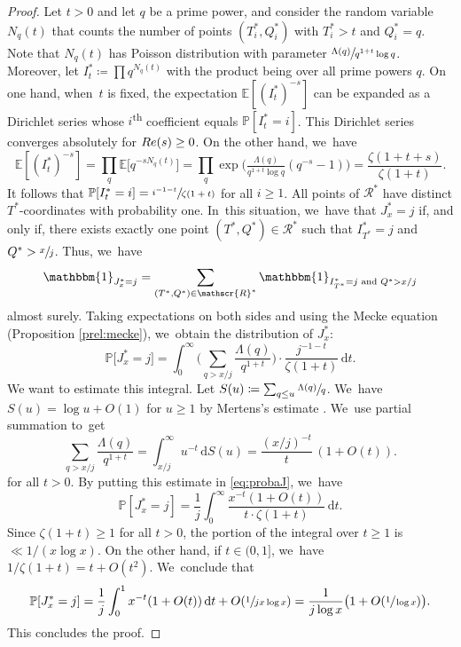 \documentclass[10pt,a4paper]{article}
\newcommand{\PP}{\mathbb{P}}
\newcommand{\EE}{\mathbb{E}}
\newcommand{\one}{\mathbbm{1}}
\newcommand{\RS}{\mathscr{R}}
\newcommand{\riemint}[4]{\int_{#1}^{#2}\! #3 \, \mathrm{d}#4}
\renewcommand{\Re}{\textup{Re}}
\newcommand{\bg}{\big}
\newcommand{\bgg}{\Big}
\theoremstyle{plain}
\theoremstyle{definition}
\begin{document}
\begin{proof}
Let $t>0$ and let $q$ be a prime power, and consider the random variable $N_q(t)$ that counts the number of points $(T^*_i, Q^*_i)$ with $T^*_i > t$ and $Q^*_i = q$. Note that $N_q(t)$ has Poisson distribution with parameter $\sfrac{\Lambda(q)}{q^{1+t}\log q}$. Moreover, let $I^*_t \coloneqq \prod q^{N_q(t)}$ with the product being over all prime powers $q$. On one hand, when~$t$ is fixed, the expectation $\EE[(I^*_t)^{-s}]$ can be expanded as a Dirichlet series whose $i$\textsuperscript{th} coefficient equals $\PP[I^*_t = i]$. This Dirichlet series converges absolutely for $\Re(s)\ge0$. On the other hand, we~have
\[
\EE[(I^*_t)^{-s}] = \prod_q \EE\bg[q^{-sN_q(t)}\bg] = \prod_q \exp\!\bgg(\tfrac{\Lambda(q)}{q^{1+t}\log q} (q^{-s}-1)\bgg) = \frac{\zeta(1+t+s)}{\zeta(1+t)}.
\]
It follows that $\PP[I^*_t = i] = \sfrac{i^{-1-t}}{\zeta(1+t)}$ for all $i \ge 1$. All points of $\RS^*$ have distinct $T^*$-coordinates with probability one. In~this situation, we~have that $J_x^* = j$ if, and only if, there exists exactly one point $(T^*, Q^*) \in \RS^*$ such that $I^*_{T^*} = j$ and $Q^* > \sfrac{x}{j}$. Thus, we~have
\[
\one _{J_x^* = j} = \sum_{(T^*, Q^*) \in \RS^*} \one _{I^*_{T^*} = j \text{ and } Q^{*}> x/j}
\]
almost surely. Taking expectations on both sides and using the Mecke equation (Proposition \ref{prel:mecke}), we~obtain the distribution of $J_x^*$:
\begin{equation}
\label{eq:probaJ}
\PP\bg[J_x^*=j\bg]
= \riemint{0}{\infty}{\bigg(\sum_{q > x/j} \frac{\Lambda(q)}{q^{1+t}}\bigg)\cdot \frac{j^{-1-t}}{\zeta(1+t)}}{t}.
\end{equation}
We want to estimate this integral. Let $S(u) \coloneqq \sum_{q \le u} \sfrac{\Lambda(q)}{q}$. We~have $S(u) = \log u + O(1)$ for $u \ge 1$ by Mertens's estimate \cite[Th.\,3.4(a)]{Koukoulo19}. We~use partial summation to~get
\[
\sum_{q > x/j} \frac{\Lambda(q)}{q^{1+t}} = \riemint{x/j}{\infty}{u^{-t}}{S(u)} = \frac{(x/j)^{-t}}{t}\,(1+O(t)).
\]
for all $t > 0$. By putting this estimate in \eqref{eq:probaJ}, we~have
\[
\PP[J_x^* = j] = \frac{1}{j} \riemint{0}{\infty}{\frac{x^{-t}(1+O(t))}{t\cdot \zeta(1+t)}}{t}.
\]
Since $\zeta(1+t)\ge1$ for all $t>0$, the portion of the integral over $t\ge1$ is $\ll 1/(x\log x)$. On the other hand, if $t\in(0,1]$, we~have $1/\zeta(1+t)=t+O(t^2)$. We~conclude that
\[
\PP[J_x^* = j] = \frac{1}{j} \int_0^1 x^{-t}(1+O(t)) \,\mathrm dt + O(\sfrac{1}{jx\log x}) = \frac{1}{j\log x}\bg(1+O(\sfrac{1}{\log x})\bg).
\]
This concludes the proof.
\end{proof}
\end{document}
